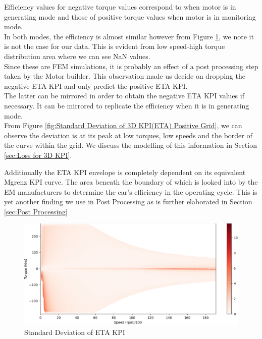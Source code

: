 \documentclass{report} %
\begin{document}
Efficiency values for negative torque values correspond to when motor is in generating mode and those of positive torque values when motor is in monitoring mode.\\
In both modes, the efficiency is almost similar however from Figure \ref{fig:Standard Deviation of 3D KPI(ETA)}, we note it is not the case for our data. 
This is evident from low speed-high torque distribution area where we can see \ac{NaN} values.\\
Since these are \ac{FEM} simulations, it is probably an effect of a post processing step taken by the Motor builder.
This observation made us decide on dropping the negative ETA \ac{KPI} and only predict the positive ETA \ac{KPI}.\\
The latter can be mirrored in order to obtain the negative ETA \ac{KPI} values if necessary.
It can be mirrored to replicate the efficiency when it is in generating mode.\\

From Figure \ref{fig:Standard Deviation of 3D KPI(ETA) Positive Grid}, we can observe the deviation is at its peak at low torques, low speeds and the border of the curve within the grid.
We discuss the modelling of this information in Section \ref{sec:Loss for 3D KPI}.

Additionally the ETA \ac{KPI} envelope is completely dependent on its equivalent Mgrenz \ac{KPI} curve. 
The area beneath the boundary of which is looked into by the \ac{EM} manufacturers to determine the car's efficiency in the operating cycle.
This is yet another finding we use in Post Processing as is further elaborated in Section \ref{sec:Post Processing}

\begin{figure}[H]
    \centering
    \includegraphics[width=1\textwidth]{./ReportImages/stddev_y2.png} 
    \caption{Standard Deviation of ETA \ac{KPI}} 
    \label{fig:Standard Deviation of 3D KPI(ETA)}
\end{figure}
\end{document}
